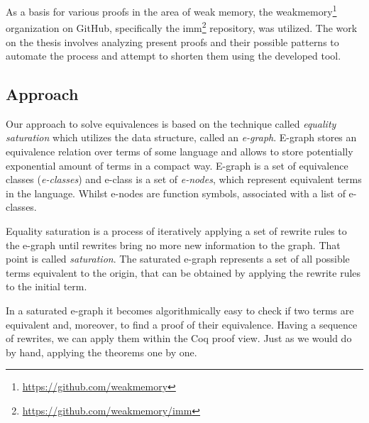 As a basis for various proofs in the area of weak memory, the weakmemory\footnote{\href{https://github.com/weakmemory}{https://github.com/weakmemory}} organization on GitHub, specifically the imm\footnote{\href{https://github.com/weakmemory/imm}{https://github.com/weakmemory/imm}} repository, was utilized. The work on the thesis involves analyzing present proofs and their possible patterns to automate the process and attempt to shorten them using the developed tool.

\subsection{Approach}
Our approach to solve equivalences is based on the technique called \textit{equality saturation} which utilizes the data structure, called an \textit{e-graph}. E-graph stores an equivalence relation over terms of some language and allows to store potentially exponential amount of terms in a compact way. E-graph is a set of equivalence classes (\textit{e-classes}) and e-class is a set of \textit{e-nodes}, which represent equivalent terms in the language. Whilst e-nodes are function symbols, associated with a list of e-classes. 

Equality saturation is a process of iteratively applying a set of rewrite rules to the e-graph until rewrites bring no more new information to the graph. That point is called \emph{saturation}. The saturated e-graph represents a set of all possible terms  equivalent to the origin, that can be obtained by applying the rewrite rules to the initial term.

In a saturated e-graph it becomes algorithmically easy to check if two terms are equivalent and, moreover, to find a proof of their equivalence. Having a sequence of rewrites, we can apply them within the Coq proof view. Just as we would do by hand, applying the theorems one by one.



